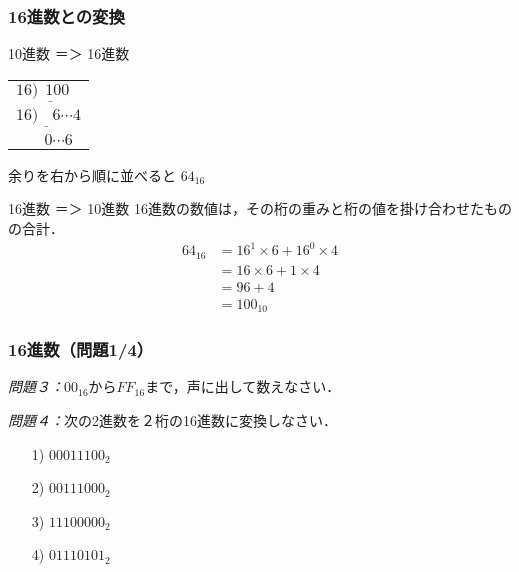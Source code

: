 \documentclass{beamer}                 %
\begin{document}
\begin{frame}
  \frametitle{16進数との変換}

  \begin{itembox}[l]{10進数 ＝＞ 16進数}
    \begin{minipage}{0.3\columnwidth}
      \begin{flushright}
        \begin{tabular}{l}
          $16 \underline{) ~~100 } $\\
          $16 \underline{) ~~~~6 } {\cdots 4}$ \\
          $~~~            ~~~~~0   {\cdots 6}$
        \end{tabular}
      \end{flushright}
    \end{minipage}
    \begin{minipage}{0.5\columnwidth}
      余りを右から順に並べると $64_{16}$
    \end{minipage}
  \end{itembox}

  \begin{itembox}[l]{16進数 ＝＞ 10進数}
    16進数の数値は，その桁の重みと桁の値を掛け合わせたものの合計．
    \begin{align*}
      64_{16} &= 16^1 \times 6 + 16^0 \times 4 \\
      &= 16 \times 6 + 1 \times 4 \\
      &= 96 + 4 \\
      &= 100_{10}
    \end{align*}
  \end{itembox}
\end{frame}

\begin{frame}
  \frametitle{16進数（問題1/4）}
\emph{問題３：}$00_{16}$から$FF_{16}$まで，声に出して数えなさい．


\emph{問題４：}次の2進数を２桁の16進数に変換しなさい．
\begin{enumerate}
\item[1)] $0001 1100_2$
\vfill
\item[2)] $0011 1000_2$
\vfill
\item[3)] $1110 0000_2$
\vfill
\item[4)] $0111 0101_2$
\vfill
\end{enumerate}
\vfill
\end{frame}
\end{document}
